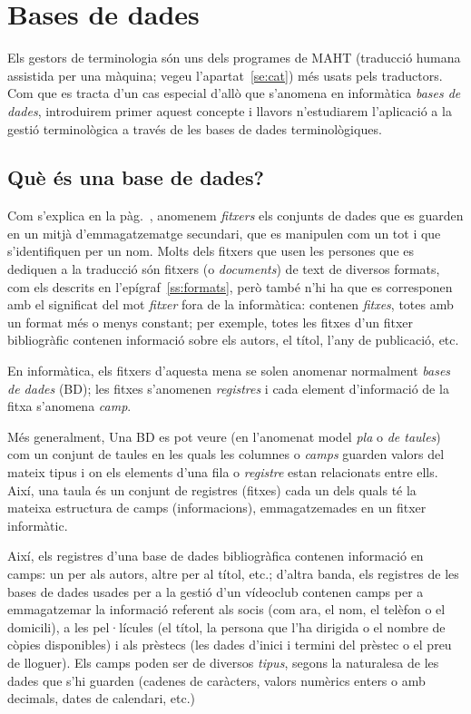 \chapter{Bases de dades}
\label{se:basesdades}

  Els gestors de terminologia són uns dels programes de MAHT (traducció
 humana assistida per una màquina; vegeu
 l'apartat~\ref{se:cat})
  més usats pels
  traductors. Com que es tracta d'un cas especial d'allò que s'anomena
 en informàtica
 \emph{bases de dades}, introduirem primer aquest concepte i llavors
 n'estudiarem l'aplicació a la gestió terminològica
 a través de les bases de dades terminològiques.


\section{Què és una base de dades?} 

Com s'explica en la pàg.~\pageref{pg:fitxer}, anomenem
\emph{fitxers} els conjunts de dades que es guarden en un mitjà
d'emmagatzematge secundari, que es manipulen com un tot i que
s'identifiquen per un nom. Molts dels fitxers que usen les persones
que es dediquen a la traducció són fitxers (o \emph{documents}) de
text de diversos formats, com els descrits en
l'epígraf~\ref{ss:formats}, però també n'hi ha que es corresponen amb
el significat del mot \emph{fitxer} fora de la informàtica: contenen
\emph{fitxes}, totes amb un format més o menys constant; per exemple,
totes les fitxes d'un fitxer bibliogràfic contenen informació sobre
els autors, el títol, l'any de publicació, etc. 

En informàtica, els fitxers d'aquesta mena se solen anomenar
normalment \emph{bases de dades} (BD); les fitxes s'anomenen
\emph{registres} i cada element d'informació de la fitxa s'anomena
\emph{camp}. 

Més generalment, Una BD es pot veure (en l'anomenat model \emph{pla} o
\emph{de taules}) com un conjunt de taules en les quals les columnes o
\emph{camps} guarden valors del mateix tipus i on els elements d'una
fila o \emph{registre} estan relacionats entre ells. Així, una taula
és un conjunt de registres (fitxes) cada un dels quals té la mateixa
estructura de camps (informacions), emmagatzemades en un fitxer
informàtic.

Així, els registres d'una base de dades bibliogràfica contenen
informació en camps: un per als autors, altre per al títol, etc.;
d'altra banda, els registres de les bases de dades usades per a la
gestió d'un vídeoclub contenen camps per a emmagatzemar la informació
referent als socis (com ara, el nom, el telèfon o el domicili), a les
pel·lícules (el títol, la persona que l'ha dirigida o el nombre de
còpies disponibles) i als prèstecs (les dades d'inici i termini del
prèstec o el preu de lloguer). Els camps poden ser de diversos
\emph{tipus}, segons la naturalesa de les dades que s'hi guarden
(cadenes de caràcters, valors numèrics enters o amb decimals, dates de
calendari, etc.)


